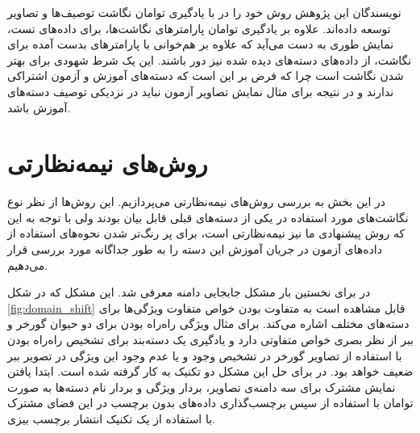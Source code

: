نویسندگان این پژوهش روش خود را در \cite{agnostic} با یادگیری توامان نگاشت توصیف‌ها و تصاویر توسعه داده‌اند. علاوه بر یادگیری توامان پارامترهای نگاشت‌ها، برای داده‌های تست، نمایش طوری به دست می‌آید که علاوه بر هم‌خوانی با پارامترهای بدست آمده برای نگاشت، از داده‌های دسته‌های دیده شده نیز دور باشند. این یک شرط شهودی برای بهتر شدن نگاشت است چرا که فرض بر این است که دسته‌های آموزش و آزمون اشتراکی ندارند و در نتیجه برای مثال نمایش تصاویر آزمون نباید در نزدیکی توصیف دسته‌های آموزش باشد.

\section{روش‌های نیمه‌نظارتی}
در این بخش به بررسی روش‌های نیمه‌نظارتی می‌پردازیم. این روش‌ها از نظر نوع نگاشت‌های مورد استفاده در یکی از دسته‌های قبلی قابل بیان بودند ولی با توجه به این که روش پیشنهادی ما نیز نیمه‌نظارتی است، برای پر رنگ‌تر شدن نحوه‌های استفاده از داده‌های آزمون در جریان آموزش این دسته را به طور جداگانه مورد بررسی قرار می‌دهیم.

در \cite{Fu2014} برای نخستین بار مشکل جابجایی دامنه معرفی شد. این مشکل که در شکل 
\ref{fig:domain_shift}
قابل مشاهده است به متفاوت بودن خواص متفاوت ویژگی‌ها برای دسته‌های مختلف اشاره می‌کند. برای مثال ویژگی راه‌راه بودن برای دو حیوان گورخر و ببر از نظر بصری خواص متفاوتی دارد و یادگیری یک دسته‌بند برای تشخیص راه‌راه بودن با استفاده از تصاویر گورخر در تشخیص وجود و یا عدم وجود این ویژگی در تصویر ببر ضعیف خواهد بود.
 در \cite{Fu2014} 
برای حل این مشکل دو تکنیک به کار گرفته شده است. ابتدا یافتن نمایش مشترک برای سه دامنه‌ی تصاویر، بردار ویژگی و بردار نام دسته‌ها به صورت توامان با استفاده از 
\cite{cca}
سپس برچسب‌گذاری داده‌های بدون برچسب در این فضای مشترک با استفاده از یک تکنیک انتشار برچسب بیزی. 

